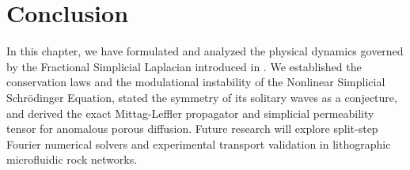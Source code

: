 \documentclass[11pt,a4paper]{article}
\theoremstyle{plain}
\theoremstyle{definition}
\theoremstyle{remark}
\numberwithin{equation}{section}
\begin{document}
\section{Conclusion}

In this chapter, we have formulated and analyzed the physical dynamics governed by the Fractional Simplicial Laplacian introduced in \cite{silvafilho2026simplex}. We established the conservation laws and the modulational instability of the Nonlinear Simplicial Schr\"odinger Equation, stated the symmetry of its solitary waves as a conjecture, and derived the exact Mittag-Leffler propagator and simplicial permeability tensor for anomalous porous diffusion. Future research will explore split-step Fourier numerical solvers and experimental transport validation in lithographic microfluidic rock networks.


\end{document}
